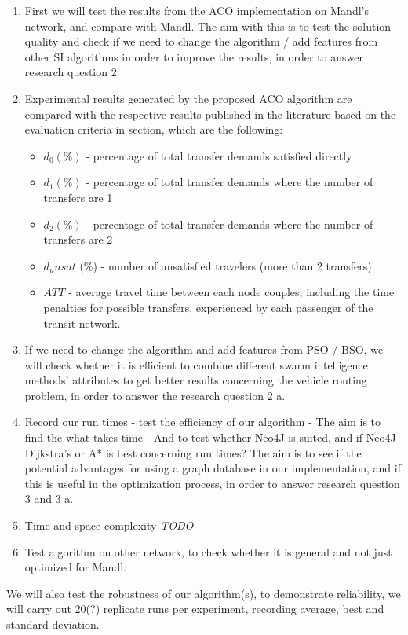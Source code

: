 \begin{enumerate}
\item First we will test the results from the ACO implementation on Mandl's network, and compare with Mandl. 
The aim with this is to test the solution quality and check if we need to change the algorithm / add features from other SI algorithms in order to improve the results, in order to answer research question 2.

\item Experimental results generated by the proposed ACO algorithm are compared with the respective results published in the literature based on the evaluation criteria in section, which are the following:
\begin{itemize}
\item $d_0 (\%)$ - percentage of total transfer demands satisfied directly
\item $d_1 (\%)$ - percentage of total transfer demands where the number of transfers are 1
\item $d_2 (\%)$ - percentage of total transfer demands where the number of transfers are 2
\item $d_unsat$ (\%) - number of unsatisfied travelers (more than 2 transfers)
\item $ATT$  - average travel time between each node couples, including the time penalties for possible transfers, experienced by each passenger of the transit network.
\end{itemize}

\item If we need to change the algorithm and add features from PSO / BSO, we will check whether it is efficient to combine different swarm intelligence methods' attributes to get better results concerning the vehicle routing problem, in order to answer the research question 2 a.

\item Record our run times - test the efficiency of our algorithm - The aim is to find the what takes time - And to test whether Neo4J is suited, and if Neo4J Dijkstra's or A* is best concerning run times? The aim is to see if the potential advantages for using a graph database in our implementation, and if this is useful in the optimization process, in order to answer research question 3 and 3 a.

\item Time and space complexity \emph{\color{red} TODO}

\item Test algorithm on other network, to check whether it is general and not just optimized for Mandl.

\end{enumerate}



We will also test the robustness of our algorithm(s), to demonstrate reliability, we will carry out 20(?) replicate runs per experiment, recording average, best and standard deviation. 



